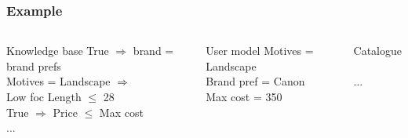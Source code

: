 \documentclass{beamer}
\begin{document}
\begin{frame}
    \frametitle{Example}
    \footnotesize
    \begin{columns}
        \begin{block}{Knowledge base}
            \ttfamily
            True $\Rightarrow$ brand = brand prefs\\
            Motives = Landscape $\Rightarrow$ \\
            \hfill Low foc Length $\leq$ 28\\
            True $\Rightarrow$ Price $\leq$ Max cost\\
            ...
        \end{block}
        \begin{block}{User model}
            \ttfamily
            Motives = Landscape\\
            Brand pref = Canon\\
            Max cost = 350
        \end{block}
        \begin{block}{Catalogue}
            \centering
            \\\vsep
            \\[\baselineskip]
            ...
        \end{block}
    \end{columns}
\end{frame}
\end{document}
